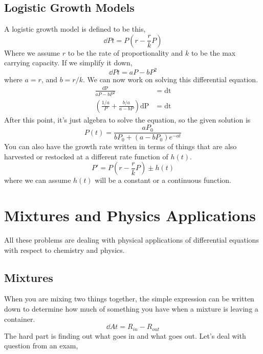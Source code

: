 \subsection{Logistic Growth Models}
A logistic growth model is defined to be this, 
\begin{equation*}
	\dd{P}{t} = P(r-\frac{r}{k}P)
\end{equation*}
Where we assume $r$ to be the rate of proportionality and $k$ to be the max carrying capacity. 
If we simplify it down, 
\begin{equation*}
	\dd{P}{t} = aP- bP^2
\end{equation*}
where $a=r$, and $b=r/k$. We can now work on solving this differential equation.
\begin{align*}
	\frac{\mathrm{dP}}{aP-bP^2} &= \mathrm{dt} \\ 
	(\frac{1/a}{P} + \frac{b/a}{a-bP})\mathrm{dP}  &= \mathrm{dt} 
\end{align*}
After this point, it's just algebra to solve the equation, so the given solution is 
\begin{equation*}
	P(t) = \frac{aP_0}{bP_0+(a-bP_0)e^{-at}}
\end{equation*}
You can also have the growth rate written in terms of things that are also harvested or restocked at a different rate function of $h(t)$.
\begin{equation*}
	P' = P(r-\frac{r}{k}P) \pm h(t)
\end{equation*}
where we can assume $h(t)$ will be a constant or a continuous function.

\section{Mixtures and Physics Applications}
All these problems are dealing with physical applications of differential equations with respect to chemistry and physics. 
\subsection{Mixtures}
When you are mixing two things together, the simple expression can be written down to determine how much of something you have when a mixture is leaving a container. 
\begin{equation*}
	\dd{A}{t} = R_{in} - R_{out}
\end{equation*}
The hard part is finding out what goes in and what goes out. Let's deal with question from an exam,



